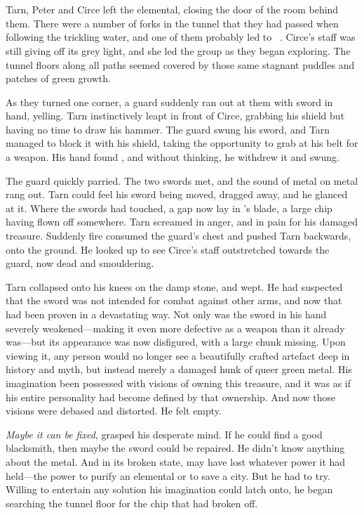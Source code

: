 \chapter{\mothzam\ \driktur}

Tarn, Peter and Circe left the elemental, closing the door of the room behind them.  There were a number of forks in the tunnel that they had passed when following the trickling water, and one of them probably led to \mothzam\ \driktur.  Circe's staff was still giving off its grey light, and she led the group as they began exploring.  The tunnel floors along all paths seemed covered by those same stagnant puddles and patches of green growth.

As they turned one corner, a guard suddenly ran out at them with sword in hand, yelling.  Tarn instinctively leapt in front of Circe, grabbing his shield but having no time to draw his hammer.    The guard swung his sword, and Tarn managed to block it with his shield, taking the opportunity to grab at his belt for a weapon.  His hand found \kildir, and without thinking, he withdrew it and swung.

The guard quickly parried.  The two swords met, and the sound of metal on metal rang out.  Tarn could feel his sword being moved, dragged away, and he glanced at it.  Where the swords had touched, a gap now lay in \kildir's blade, a large chip having flown off somewhere.  Tarn screamed in anger, and in pain for his damaged treasure.  Suddenly fire consumed the guard's chest and pushed Tarn backwards, onto the ground.  He looked up to see Circe's staff outstretched towards the guard, now dead and smouldering.

Tarn collapsed onto his knees on the damp stone, and wept.  He had suspected that the sword was not intended for combat against other arms, and now that had been proven in a devastating way.   Not only was the sword in his hand severely weakened---making it even more defective as a weapon than it already was---but its appearance was now disfigured, with a large chunk missing.  Upon viewing it, any person would no longer see a beautifully crafted artefact deep in history and myth, but instead merely a damaged hunk of queer green metal.  His imagination been possessed with visions of owning this treasure, and it was as if his entire personality had become defined by that ownership.  And now those visions were debased and distorted.  He felt empty.

\emph{Maybe it can be fixed}, grasped his desperate mind.  If he could find a good blacksmith, then maybe the sword could be repaired.  He didn't know anything about the metal.  And in its broken state, \kildir may have lost whatever power it had held---the power to purify an elemental or to save a city.  But he had to try.  Willing to entertain any solution his imagination could latch onto, he began searching the tunnel floor for the chip that had broken off.

